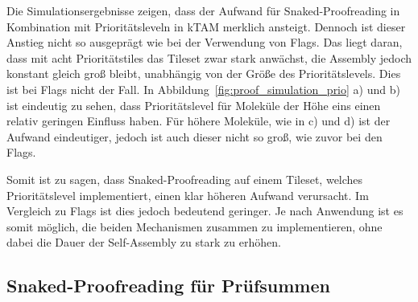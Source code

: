 Die Simulationsergebnisse zeigen, dass der Aufwand für Snaked-Proofreading in Kombination mit Prioritätsleveln in kTAM merklich ansteigt. Dennoch ist dieser Anstieg nicht so ausgeprägt wie bei der Verwendung von Flags. Das liegt daran, dass mit acht Prioritätstiles das Tileset zwar stark anwächst, die Assembly jedoch konstant gleich groß bleibt, unabhängig von der Größe des Prioritätslevels. Dies ist bei Flags nicht der Fall. In Abbildung~\ref{fig:proof_simulation_prio} a) und b) ist eindeutig zu sehen, dass Prioritätslevel für Moleküle der Höhe eins einen relativ geringen Einfluss haben. Für höhere Moleküle, wie in c) und d) ist der Aufwand eindeutiger, jedoch ist auch dieser nicht so groß, wie zuvor bei den Flags.

Somit ist zu sagen, dass Snaked-Proofreading auf einem Tileset, welches Prioritätslevel implementiert, einen klar höheren Aufwand verursacht. Im Vergleich zu Flags ist dies jedoch bedeutend geringer. Je nach Anwendung ist es somit möglich, die beiden Mechanismen zusammen zu implementieren, ohne dabei die Dauer der Self-Assembly zu stark zu erhöhen.

\subsection{Snaked-Proofreading für Prüfsummen}


